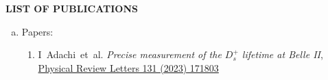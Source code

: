 \documentclass[12pt]{article}
\begin{document}
\pagebreak
\vspace{0.4cm}
\colorbox{gray!40}{\begin{minipage}{16.2cm}
    \bf {LIST OF PUBLICATIONS} 
\end{minipage} }
\begin{justify}
\begin{enumerate}[a.]
\item Papers:
  \begin{enumerate}[1.]
  \item I~Adachi~et~al. \emph{Precise measurement of the $D_s^+$ lifetime at Belle II}, \href{https://doi.org/10.1103/PhysRevLett.131.171803}{Physical Review Letters 131 (2023) 171803}

\end{enumerate}
\end{enumerate}
\end{justify}
\end{document}

